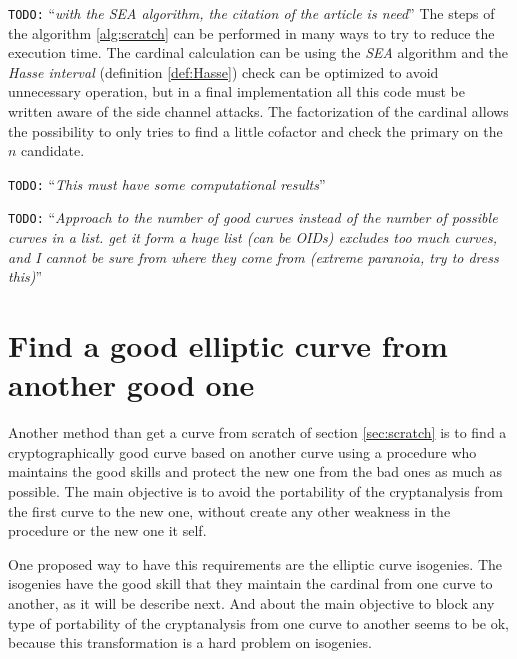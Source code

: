 \documentclass[10pt,a4paper,twoside]{llncs}
\newcommand{\todo}[1]{\texttt{\color{red}TODO:} ``\emph{#1}''}
\begin{document}
\todo{with the SEA algorithm, the citation of the article is need}
The steps of the algorithm \ref{alg:scratch} can be performed in many ways to try to reduce the execution time. The cardinal calculation can be using the \emph{SEA} algorithm  and the \emph{Hasse interval} (definition \ref{def:Hasse}) check can be optimized to avoid unnecessary operation, but in a final implementation all this code must be written aware of the side channel attacks. The factorization of the cardinal allows the possibility to only tries to find a little cofactor and check the primary on the $n$ candidate.

\todo{This must have some computational results}

\todo{Approach to the number of good curves instead of the number of possible curves in a list. get it form a huge list (can be OIDs) excludes too much curves, and I cannot be sure from where they come from (extreme paranoia, try to dress this)}
\cite{DAS_guide}%

\section{Find a good elliptic curve from another good one \label{sec:from_another}}

Another method than get a curve from scratch of section \ref{sec:scratch} is to find a cryptographically good curve based on another curve using a procedure who maintains the good skills and protect the new one from the bad ones as much as possible. The main objective is to avoid the portability of the cryptanalysis from the first curve to the new one, without create any other weakness in the procedure or the new one it self.

One proposed way to have this requirements are the elliptic curve isogenies. The isogenies have the good skill that they maintain the cardinal from one curve to another, as it will be describe next. And about the main objective to block any type of portability of the cryptanalysis from one curve to another seems to be ok, because this transformation is a hard problem on isogenies.

\end{document}
